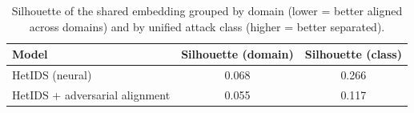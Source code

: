 \begin{table}[htbp]\centering\scriptsize
\caption{Silhouette of the shared embedding grouped by domain (lower = better aligned across domains) and by unified attack class (higher = better separated).}
\label{tab:align}
\begin{tabular}{lcc}
\toprule
Model & Silhouette (domain) & Silhouette (class) \\
\midrule
HetIDS (neural) & 0.068 & 0.266 \\
HetIDS + adversarial alignment & 0.055 & 0.117 \\
\bottomrule
\end{tabular}
\end{table}